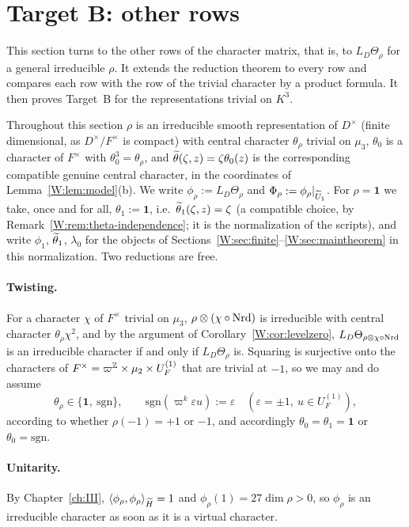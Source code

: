 \section{Target B: other rows}\label{W:sec:plan}
This section turns to the other rows of the character matrix, that is, to $L_D\Theta_\rho$ for a general irreducible $\rho$. It extends the reduction theorem to every row and compares each row with the row of the trivial character by a product formula. It then proves Target~B for the representations trivial on $K^3$.

Throughout this section $\rho$ is an irreducible smooth representation of
$D^\times$ (finite dimensional, as $D^\times/F^\times$ is compact) with
central character $\theta_\rho$ trivial on $\mu_3$, $\theta_0$ is a
character of $F^\times$ with $\theta_0^3=\theta_\rho$, and
$\widetilde\theta(\zeta,z)=\zeta\theta_0(z)$ is the corresponding compatible genuine
central character, in the coordinates of Lemma~\ref{W:lem:model}(b).  We
write $\phi_\rho:=L_D\Theta_\rho$ and $\Phi_\rho:=\phi_\rho|_{\widetilde U_1}$.
For $\rho=\mathbf1$ we take, once and for all, $\theta_1:=\mathbf1$,
i.e.\ $\widetilde\theta_1(\zeta,z)=\zeta$ (a compatible choice, by
Remark~\ref{W:rem:theta-independence}; it is the normalization of the
scripts), and write $\phi_1$, $\widetilde\theta_1$, $\lambda_0$ for the objects of
Sections~\ref{W:sec:finite}--\ref{W:sec:maintheorem} in this normalization.
Two reductions are free.

\paragraph{Twisting.}  For a character $\chi$ of $F^\times$ trivial on
$\mu_3$, $\rho\otimes(\chi\circ\operatorname{Nrd})$ is irreducible with central
character $\theta_\rho\chi^2$, and by the argument of
Corollary~\ref{W:cor:levelzero}, $L_D\Theta_{\rho\otimes\chi\circ\operatorname{Nrd}}$ is
an irreducible character if and only if $L_D\Theta_\rho$ is.  Squaring
is surjective onto the characters of $F^\times=\varpi^{\mathbb Z}\times\mu_2\times U_F^{(1)}$
that are trivial at $-1$, so we may and do assume
\begin{equation}\label{W:eq:normalized-central}
 \theta_\rho\in\{\mathbf1,\ \mathrm{sgn}\},\qquad
 \mathrm{sgn}(\varpi^k\varepsilon u):=\varepsilon\quad(\varepsilon=\pm1,\ u\in U_F^{(1)}),
\end{equation}
according to whether $\rho(-1)=+1$ or $-1$, and accordingly
$\theta_0=\theta_1=\mathbf1$ or $\theta_0=\mathrm{sgn}$.

\paragraph{Unitarity.}  By Chapter~\ref{ch:III}, $\langle\phi_\rho,\phi_\rho\rangle_{\widetilde H}=1$
and $\phi_\rho(1)=27\dim\rho>0$, so $\phi_\rho$ is an irreducible
character as soon as it is a virtual character.

